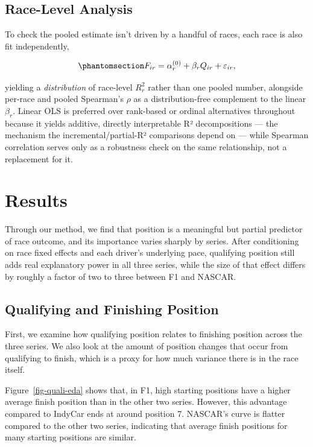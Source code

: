 \documentclass[
  10pt]{article}
\begin{document}
\subsection{Race-Level Analysis}\label{race-level-analysis}

To check the pooled estimate isn't driven by a handful of races, each
race is also fit independently,

\begin{equation}\protect\phantomsection\label{eq-race-level}{
F_{ir} = \alpha_r^{(0)} + \beta_r Q_{ir} + \varepsilon_{ir},
}\end{equation}

yielding a \emph{distribution} of race-level \(R^2_r\) rather than one
pooled number, alongside per-race and pooled Spearman's \(\rho\) as a
distribution-free complement to the linear \(\beta_r\). Linear OLS is
preferred over rank-based or ordinal alternatives throughout because it
yields additive, directly interpretable R² decompositions --- the
mechanism the incremental/partial-R² comparisons depend on --- while
Spearman correlation serves only as a robustness check on the same
relationship, not a replacement for it.

\section{Results}\label{sec-results}

Through our method, we find that position is a meaningful but partial
predictor of race outcome, and its importance varies sharply by series.
After conditioning on race fixed effects and each driver's underlying
pace, qualifying position still adds real explanatory power in all three
series, while the size of that effect differs by roughly a factor of two
to three between F1 and NASCAR.

\subsection{Qualifying and Finishing
Position}\label{qualifying-and-finishing-position}

First, we examine how qualifying position relates to finishing position
across the three series. We also look at the amount of position changes
that occur from qualifying to finish, which is a proxy for how much
variance there is in the race itself.

Figure~\ref{fig-quali-eda} shows that, in F1, high starting positions
have a higher average finish position than in the other two series.
However, this advantage compared to IndyCar ends at around position 7.
NASCAR's curve is flatter compared to the other two series, indicating
that average finish positions for many starting positions are similar.
\end{document}

